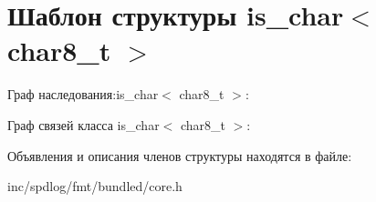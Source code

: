 \hypertarget{structis__char_3_01char8__t_01_4}{}\section{Шаблон структуры is\+\_\+char$<$ char8\+\_\+t $>$}
\label{structis__char_3_01char8__t_01_4}


Граф наследования\+:is\+\_\+char$<$ char8\+\_\+t $>$\+:


Граф связей класса is\+\_\+char$<$ char8\+\_\+t $>$\+:


Объявления и описания членов структуры находятся в файле\+:\begin{DoxyCompactItemize}
\item 
inc/spdlog/fmt/bundled/core.\+h\end{DoxyCompactItemize}
